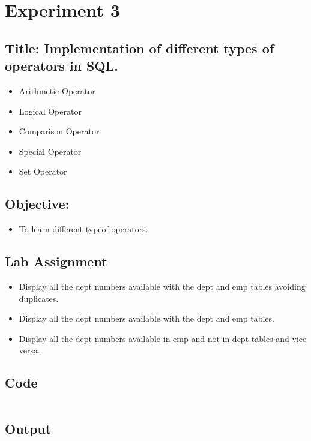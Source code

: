 \documentclass{article}
\begin{document}
\section*{Experiment 3}
\subsection*{\textbf{Title:} Implementation of different types of operators in SQL.}
\begin{itemize}
	\item Arithmetic Operator
	\item Logical Operator
	\item Comparison Operator
	\item Special Operator
	\item Set Operator
\end{itemize}
\subsection*{\textbf{Objective:}}
\begin{itemize}
	\item To learn different typeof operators.
\end{itemize}
\subsection*{Lab Assignment}
\begin{itemize}
	\item Display all the dept numbers available with the dept and emp tables avoiding duplicates.
	\item Display all the dept numbers available with the dept and emp tables.
	\item Display all the dept numbers available in emp and not in dept tables and vice versa.
\end{itemize}
\subsection*{Code}
\inputminted{sql}{code/4.sql}
\subsection*{Output}

\end{document}
